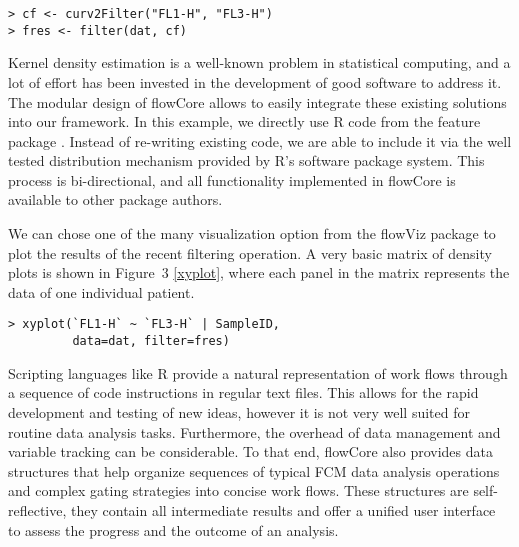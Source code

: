 \documentclass[10pt]{bmc_article}
\newcommand{\Rpackage}[1]{{\textsf{#1}}}
\newenvironment{bmcformat}{\begin{raggedright}\baselineskip20pt\sloppy\setboolean{publ}{false}}{\end{raggedright}\baselineskip20pt\sloppy}
\begin{document}
\begin{bmcformat}
\begin{verbatim}
> cf <- curv2Filter("FL1-H", "FL3-H")
> fres <- filter(dat, cf)
\end{verbatim}

Kernel density estimation is a well-known problem in statistical
computing, and a lot of effort has been invested in the development of
good software to address it. The modular design of \Rpackage{flowCore}
allows to easily integrate these existing solutions into our
framework. In this example, we directly use R code from the
\Rpackage{feature} package \cite{wand2008}. Instead of
re-writing existing code, we are able to include it via the well
tested distribution mechanism provided by R's software package
system. This process is bi-directional, and all functionality
implemented in \Rpackage{flowCore} is available to other package
authors.

We can chose one of the many visualization option from the
\Rpackage{flowViz} package to plot the results of the recent filtering
operation. A very basic matrix of density plots is shown in Figure~3
\ref{xyplot}, where each panel in the matrix represents the data of
one individual patient.

\begin{verbatim}
> xyplot(`FL1-H` ~ `FL3-H` | SampleID, 
         data=dat, filter=fres)
\end{verbatim}

Scripting languages like R provide a natural representation of work
flows through a sequence of code instructions in regular text
files. This allows for the rapid development and testing of new ideas,
however it is not very well suited for routine data analysis
tasks. Furthermore, the overhead of data management and variable
tracking can be considerable. To that end, \Rpackage{flowCore} also
provides data structures that help organize sequences of typical FCM
data analysis operations and complex gating strategies into concise
work flows. These structures are self-reflective, they contain all
intermediate results and offer a unified user interface to assess the
progress and the outcome of an analysis.


\end{bmcformat}
\end{document}
